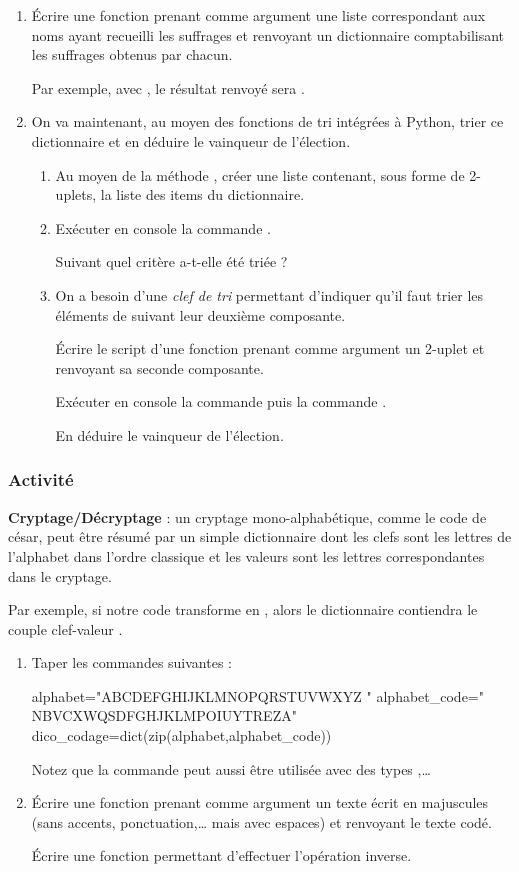 \documentclass[11pt,a4paper,french,twoside]{PMCours}
\newcounter{activite}
\newcommand{\activite}{\subsubsection*{Activité~\refstepcounter{activite}\theactivite}}
\begin{document}
\begin{enumerate}
\item Écrire une fonction  prenant comme argument 
une liste  correspondant aux noms ayant recueilli les suffrages 
et renvoyant un dictionnaire comptabilisant les suffrages obtenus par chacun.

Par exemple, avec , 
le résultat renvoyé sera .

\item On va maintenant, au moyen des fonctions de tri intégrées à Python, 
trier ce dictionnaire et en déduire le vainqueur de l'élection.
\begin{enumerate}
\item Au moyen de la méthode , 
créer une liste  contenant, sous forme de 2-uplets, 
la liste des items du dictionnaire.
\item Exécuter en console la commande . 

Suivant quel critère  a-t-elle été triée ?
\item On a besoin d'une {\em clef de tri} permettant d'indiquer qu'il faut trier
les éléments de  suivant leur deuxième composante.

Écrire le script d'une fonction  prenant comme argument 
un 2-uplet  et renvoyant sa seconde composante.

Exécuter en console la commande  
puis la commande . 

En déduire le vainqueur de l'élection.

\end{enumerate}
\end{enumerate}

\activite 
\textbf{Cryptage/Décryptage} : 
un cryptage mono-alphabétique, comme le code de césar, 
peut être résumé par un simple dictionnaire 
dont les clefs sont les lettres de l'alphabet dans l'ordre classique 
et les valeurs sont les lettres correspondantes dans le cryptage.

Par exemple, si notre code transforme  en , 
alors le dictionnaire contiendra le couple clef-valeur .

\begin{enumerate}
\item Taper les commandes suivantes :
\begin{Python}
alphabet="ABCDEFGHIJKLMNOPQRSTUVWXYZ "
alphabet_code=" NBVCXWQSDFGHJKLMPOIUYTREZA"
dico_codage=dict(zip(alphabet,alphabet_code))
\end{Python}
Notez que la commande  peut aussi être utilisée 
avec des types ,\dots
\item Écrire une fonction  prenant comme argument 
un texte écrit en majuscules (sans accents, ponctuation,\dots{} mais avec espaces) 
et renvoyant le texte codé.

Écrire une fonction  permettant d'effectuer 
l'opération inverse.
\end{enumerate}
\end{document}
